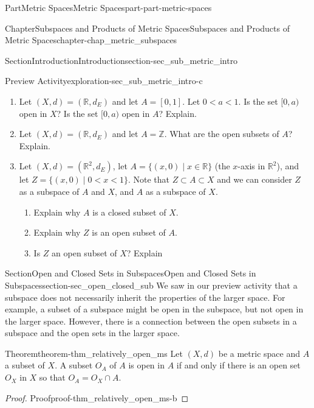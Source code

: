 \documentclass[oneside,10pt,]{book}
\numberwithin{equation}{chapter}
\newcommand{\Z}{\mathbb{Z}}
\newcommand{\R}{\mathbb{R}}
\newcommand{\lt}{<}
\begin{document}
\begin{partptx}{Part}{Metric Spaces}{}{Metric Spaces}{}{}{part-part-metric-spaces}
\begin{chapterptx}{Chapter}{Subspaces and Products of Metric Spaces}{}{Subspaces and Products of Metric Spaces}{}{}{chapter-chap_metric_subspaces}
\begin{sectionptx}{Section}{Introduction}{}{Introduction}{}{}{section-sec_sub_metric_intro}
\begin{exploration}{Preview Activity}{}{exploration-sec_sub_metric_intro-c}
\begin{enumerate}[font=\bfseries,label=(\alph*),ref=\alph*]
\begin{definition}{Definition}{}{definition-sec_sub_metric_intro-c-b-a-b}
\begin{equation*}
d_A(a_1,a_2) = d(a_1,a_2)
\end{equation*}
for all \(a_1,a_2 \in A\).%
\end{definition}
We might wonder what, if any, properties of the space \(X\) are inherited by a subspace.%
\item{}Let \((X,d) = (\R,d_E)\) and let \(A = [0,1]\). Let \(0 \lt a \lt 1\). Is the set \([0,a)\) open in \(X\)? Is the set \([0,a)\) open in \(A\)? Explain.%
\item{}Let \((X,d) = (\R,d_E)\) and let \(A = \Z\). What are the open subsets of \(A\)? Explain.%
\item{}Let \((X,d) = (\R^2,d_E)\), let \(A = \{(x,0) \mid x \in \R\}\) (the \(x\)-axis in \(\R^2\)), and let \(Z = \{(x,0) \mid 0 \lt x \lt 1\}\). Note that \(Z \subset A \subset X\) and we can consider \(Z\) as a subspace of \(A\) and \(X\), and \(A\) as a subspace of \(X\).%
\begin{enumerate}[font=\bfseries,label=(\roman*),ref=\theenumi.\roman*]%
\item{}Explain why \(A\) is a closed subset of \(X\).%
\item{}Explain why \(Z\) is an open subset of \(A\).%
\item{}Is \(Z\) an open subset of \(X\)? Explain%
\end{enumerate}%
\end{enumerate}%
\end{exploration}%
\end{sectionptx}
%
%
\typeout{************************************************}
\typeout{************************************************}
%
\begin{sectionptx}{Section}{Open and Closed Sets in Subspaces}{}{Open and Closed Sets in Subspaces}{}{}{section-sec_open_closed_sub}
We saw in our preview activity that a subspace does not necessarily inherit the properties of the larger space. For example, a subset of a subspace might be open in the subspace, but not open in the larger space. However, there is a connection between the open subsets in a subspace and the open sets in the larger space.%
\begin{theorem}{Theorem}{}{}{theorem-thm_relatively_open_ms}%
Let \((X,d)\) be a metric space and \(A\) a subset of \(X\). A subset \(O_A\) of \(A\) is open in \(A\) if and only if there is an open set \(O_X\) in \(X\) so that \(O_A = O_X \cap A\).%
\end{theorem}
\begin{proof}{Proof}{}{proof-thm_relatively_open_ms-b}

\end{proof}
\end{sectionptx}
\end{chapterptx}
\end{partptx}
\end{document}
